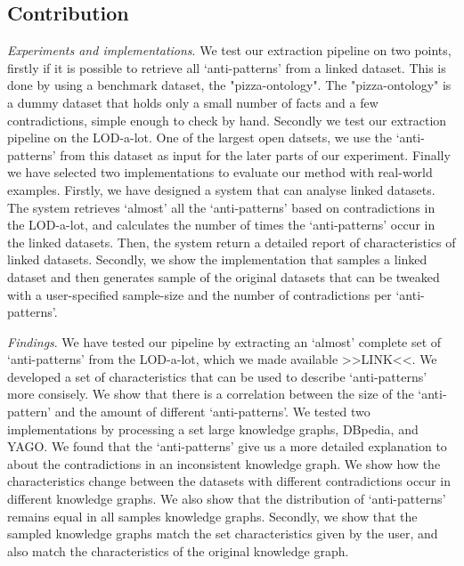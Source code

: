 \documentclass{article}
\begin{document}
\subsection{Contribution}
\textit{Experiments and implementations}. We test our extraction pipeline on two points, firstly if it is possible to retrieve all `anti-patterns' from a linked dataset. This is done by using a benchmark dataset, the "pizza-ontology". The "pizza-ontology" is a dummy dataset that holds only a small number of facts and a few contradictions, simple enough to check by hand. Secondly we test our extraction pipeline on the LOD-a-lot. One of the largest open datsets, we use the `anti-patterns' from this dataset as input for the later parts of our experiment.
Finally we have selected two implementations to evaluate our method with real-world examples. Firstly, we have designed a system that can analyse linked datasets. The system retrieves `almost' all the  `anti-patterns' based on contradictions in the LOD-a-lot, and calculates the number of times the `anti-patterns' occur in the linked datasets. Then, the system return a detailed report of characteristics of linked datasets.
Secondly, we show the implementation that samples a linked dataset and then generates sample of the original datasets that can be tweaked with a user-specified sample-size and the number of contradictions per `anti-patterns'. 

\textit{Findings}. We have tested our pipeline by extracting an `almost' complete set of `anti-patterns' from the LOD-a-lot\cite{JavierD:2017}, which we made available >>LINK<<. We developed a set of characteristics that can be used to describe `anti-patterns' more consisely. 
We show that there is a correlation between the size of the `anti-pattern' and the amount of different `anti-patterns'. 
We tested two implementations by processing a set large knowledge graphs, DBpedia\cite{DBpedia}, and YAGO\cite{YAGO}.
We found that the `anti-patterns' give us a more detailed explanation to about the contradictions in an inconsistent knowledge graph. 
We show how the characteristics change between the datasets with different contradictions occur in different knowledge graphs. We also show that the  distribution of `anti-patterns' remains equal in all samples knowledge graphs. 
Secondly, we show that the sampled knowledge graphs match the set characteristics given by the user, and also match the characteristics of the original knowledge graph.\\
\end{document}
